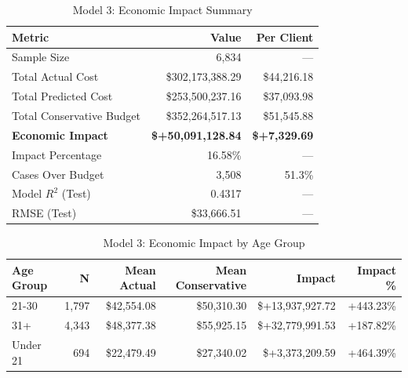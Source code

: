 \begin{table}[htbp]
\centering
\small
\caption{Model 3: Economic Impact Summary}
\label{tab:model3_impact_summary}
\begin{tabular}{lrr}
\toprule
\textbf{Metric} & \textbf{Value} & \textbf{Per Client} \\
\midrule
Sample Size & 6,834 & --- \\
\midrule
Total Actual Cost & \$302,173,388.29 & \$44,216.18 \\
Total Predicted Cost & \$253,500,237.16 & \$37,093.98 \\
Total Conservative Budget & \$352,264,517.13 & \$51,545.88 \\
\midrule
\textbf{Economic Impact} & \textbf{\$+50,091,128.84} & \textbf{\$+7,329.69} \\
Impact Percentage & 16.58\% & --- \\
\midrule
Cases Over Budget & 3,508 & 51.3\% \\
\midrule
Model $R^2$ (Test) & 0.4317 & --- \\
RMSE (Test) & \$33,666.51 & --- \\
\bottomrule
\end{tabular}
\end{table}

\begin{table}[htbp]
\centering
\small
\caption{Model 3: Economic Impact by Age Group}
\label{tab:model3_impact_age}
\begin{tabular}{lrrrrr}
\toprule
\textbf{Age Group} & \textbf{N} & \textbf{Mean Actual} & \textbf{Mean Conservative} & \textbf{Impact} & \textbf{Impact \%} \\
\midrule
21-30 & 1,797 & \$42,554.08 & \$50,310.30 & \$+13,937,927.72 & +443.23\% \\
31+ & 4,343 & \$48,377.38 & \$55,925.15 & \$+32,779,991.53 & +187.82\% \\
Under 21 & 694 & \$22,479.49 & \$27,340.02 & \$+3,373,209.59 & +464.39\% \\
\bottomrule
\end{tabular}
\end{table}


